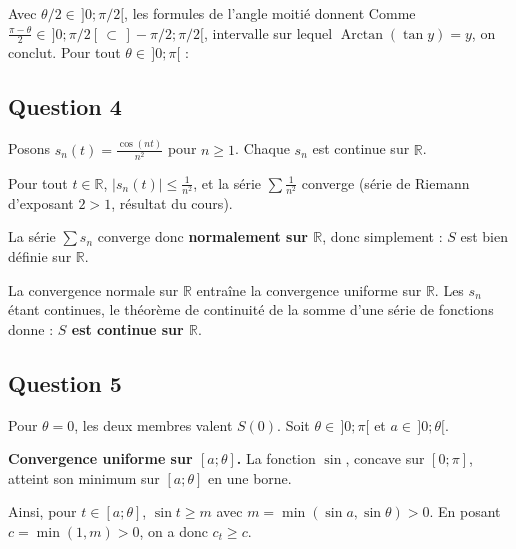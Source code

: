 \documentclass[11pt,a4paper]{article}
\newcommand{\equationajustee}[1]{%
  \sbox{\boiteequation}{$\displaystyle #1$}%
  \ifdim\wd\boiteequation>\linewidth
    \[\resizebox{\linewidth}{!}{\usebox{\boiteequation}}\]%
  \else
    \[#1\]%
  \fi}
\begin{document}
Avec \(\theta/2\in\,]0;\pi/2[\), les formules de l'angle moitié donnent
\equationajustee{\begin{aligned}
\frac{\sin\theta}{1-\cos\theta}&=\frac{2\sin(\theta/2)\cos(\theta/2)}{2\sin^2(\theta/2)}\\
&=\frac{\cos(\theta/2)}{\sin(\theta/2)}\\
&=\tan\left(\frac{\pi-\theta}{2}\right).
\end{aligned}}
Comme \(\frac{\pi-\theta}{2}\in\,]0;\pi/2[\,\subset\,]-\pi/2;\pi/2[\), intervalle sur lequel \(\operatorname{Arctan}(\tan y)=y\), on conclut. Pour tout \(\theta\in\,]0;\pi[\) :
\equationajustee{\boxed{\sum_{k=1}^{+\infty}\frac{\sin(k\theta)}{k}=\frac{\pi-\theta}{2}.}}

\hypertarget{question-4}{%
\subsection{Question 4}\label{question-4}}

Posons \(s_n(t)=\frac{\cos(nt)}{n^2}\) pour \(n\ge1\). Chaque \(s_n\) est continue sur \(\mathbb{R}\).

Pour tout \(t\in\mathbb{R}\), \(|s_n(t)|\le\frac1{n^2}\), et la série \(\sum\frac1{n^2}\) converge (série de Riemann d'exposant \(2>1\), résultat du cours).

La série \(\sum s_n\) converge donc \textbf{normalement sur \(\mathbb{R}\)}, donc simplement : \(S\) est bien définie sur \(\mathbb{R}\).

La convergence normale sur \(\mathbb{R}\) entraîne la convergence uniforme sur \(\mathbb{R}\). Les \(s_n\) étant continues, le théorème de continuité de la somme d'une série de fonctions donne : \textbf{\(S\) est continue sur \(\mathbb{R}\)}.

\hypertarget{question-5}{%
\subsection{Question 5}\label{question-5}}

Pour \(\theta=0\), les deux membres valent \(S(0)\). Soit \(\theta\in\,]0;\pi[\) et \(a\in\,]0;\theta[\).

\textbf{Convergence uniforme sur \([a;\theta]\).} La fonction \(\sin\), concave sur \([0;\pi]\), atteint son minimum sur \([a;\theta]\) en une borne.

Ainsi, pour \(t\in[a;\theta]\), \(\sin t\ge m\) avec \(m=\min(\sin a,\sin\theta)>0\). En posant \(c=\min(1,m)>0\), on a donc \(c_t\ge c\).
\end{document}
